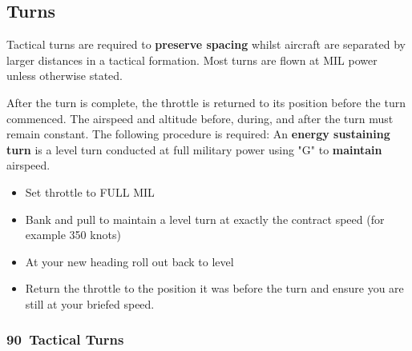 \newpage

\subsection{Turns}

Tactical turns are required to \textbf{preserve spacing} whilst aircraft are
separated by larger distances in a tactical formation. Most turns are flown at
MIL power unless otherwise stated.

After the turn is complete, the throttle is returned to its position before the
turn commenced. The airspeed and altitude before, during, and after the turn
must remain constant. The following procedure is required: An \textbf{energy
sustaining turn} is a level turn conducted at full military power using "G" to
\textbf{maintain} airspeed.

\begin{itemize}

  \item Set throttle to FULL MIL

  \item Bank and pull to maintain a level turn at exactly the contract speed
    (for example 350 knots)

  \item At your new heading roll out back to level

  \item Return the throttle to the position it was before the turn and ensure
    you are still at your briefed speed.

\end{itemize}


\subsubsection{90\textdegree~Tactical Turns}


